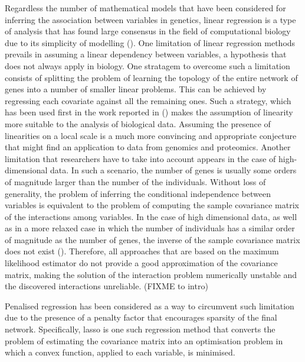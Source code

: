 Regardless the number of mathematical models that have been considered for inferring the association between variables in genetics, linear regression is a type of analysis that has found large consensus in the field of computational biology due to its simplicity of modelling (\citealp{linregression2, linregression1}). %
One limitation of linear regression methods prevails in assuming a linear dependency between variables, a hypothesis that does not always apply in biology. One stratagem to overcome such a limitation consists of splitting the problem of learning the topology of the entire network of genes into a number of smaller linear problems. This can be achieved by regressing each covariate against all the remaining ones.  Such a strategy, which has been used first in the work reported in (\citealp{Meinshausen06highdimensional}) makes the assumption of linearity more suitable to the analysis of biological data.  Assuming the presence of linearities on a local scale is a much more convincing and appropriate conjecture that might find an application to data from genomics and proteomics.
Another limitation that researchers have to take into account appears in the case of high-dimensional data. In such a scenario, the number of genes is usually some orders of magnitude larger than the number of the individuals. 
Without loss of generality, the problem of inferring the conditional independence between variables is equivalent to the problem of computing the sample covariance matrix of the interactions among variables. In the case of high dimensional data, as well as in a more relaxed case in which the number of individuals has a similar order of magnitude as the number of genes, the inverse of the sample covariance matrix does not exist (\citealp{Buhl93mle}). Therefore, all approaches that are based on the maximum likelihood estimator do not provide a good approximation of the covariance matrix, making the solution of the interaction problem numerically unstable and the discovered interactions unreliable. 
(FIXME to intro)

Penalised regression has been considered as a way to circumvent such limitation due to the presence of a penalty factor that encourages sparsity of the final network.
Specifically, lasso is one such regression method that converts the problem of estimating the covariance matrix into an optimisation problem in which a convex function, applied to each variable, is minimised.


